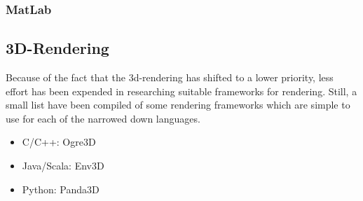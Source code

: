 \subsubsection{MatLab}
\subsection{3D-Rendering}
Because of the fact that the 3d-rendering has shifted to a lower priority, less effort has been expended in researching suitable frameworks for rendering. Still, a small list have been compiled of some rendering frameworks which are simple to use for each of the narrowed down languages.
\begin{itemize}
	\item C/C++: Ogre3D
	\item Java/Scala: Env3D
	\item Python: Panda3D
\end{itemize}
